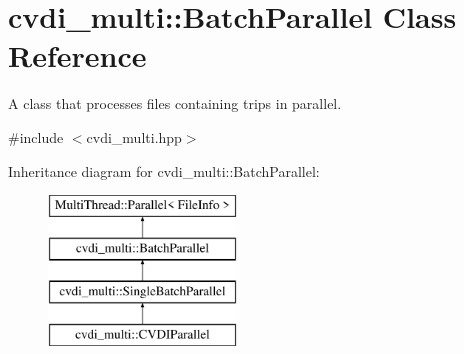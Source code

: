 \hypertarget{classcvdi__multi_1_1BatchParallel}{}\section{cvdi\+\_\+multi\+:\+:Batch\+Parallel Class Reference}
\label{classcvdi__multi_1_1BatchParallel}


A class that processes files containing trips in parallel.  




{\ttfamily \#include $<$cvdi\+\_\+multi.\+hpp$>$}

Inheritance diagram for cvdi\+\_\+multi\+:\+:Batch\+Parallel\+:\begin{figure}[H]
\begin{center}
\leavevmode
\includegraphics[height=4.000000cm]{classcvdi__multi_1_1BatchParallel}
\end{center}
\end{figure}

